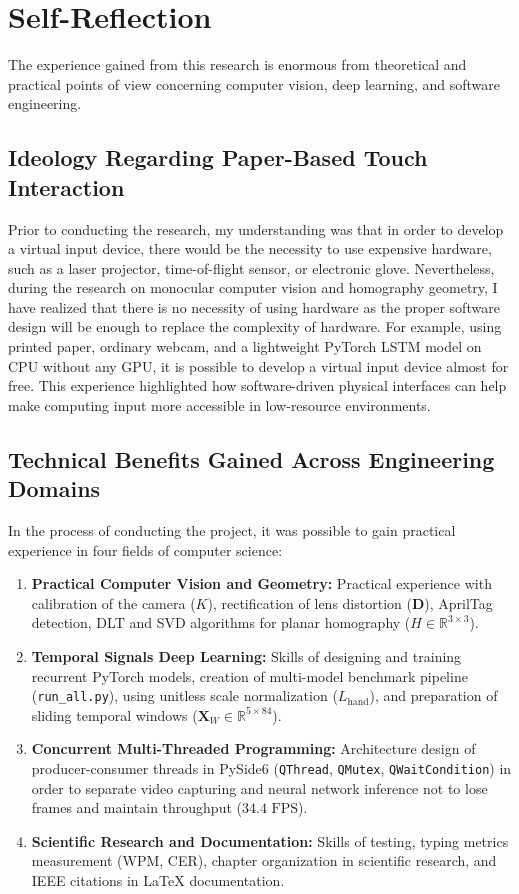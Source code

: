 \section{Self-Reflection}
\label{sec:concl_reflection}
The experience gained from this research is enormous from theoretical and practical points of view concerning computer vision, deep learning, and software engineering.

\subsection{Ideology Regarding Paper-Based Touch Interaction}
Prior to conducting the research, my understanding was that in order to develop a virtual input device, there would be the necessity to use expensive hardware, such as a laser projector, time-of-flight sensor, or electronic glove. Nevertheless, during the research on monocular computer vision and homography geometry, I have realized that there is no necessity of using hardware as the proper software design will be enough to replace the complexity of hardware. For example, using printed paper, ordinary webcam, and a lightweight PyTorch LSTM model on CPU without any GPU, it is possible to develop a virtual input device almost for free. This experience highlighted how software-driven physical interfaces can help make computing input more accessible in low-resource environments.

\subsection{Technical Benefits Gained Across Engineering Domains}
In the process of conducting the project, it was possible to gain practical experience in four fields of computer science:
\begin{enumerate}
    \item \textbf{Practical Computer Vision and Geometry:} Practical experience with calibration of the camera ($K$), rectification of lens distortion ($\mathbf{D}$), AprilTag detection, DLT and SVD algorithms for planar homography ($H \in \mathbb{R}^{3 \times 3}$).
    \item \textbf{Temporal Signals Deep Learning:} Skills of designing and training recurrent PyTorch models, creation of multi-model benchmark pipeline (\texttt{run\_all.py}), using unitless scale normalization ($L_{\text{hand}}$), and preparation of sliding temporal windows ($\mathbf{X}_W \in \mathbb{R}^{5 \times 84}$).
    \item \textbf{Concurrent Multi-Threaded Programming:} Architecture design of producer-consumer threads in PySide6 (\texttt{QThread}, \texttt{QMutex}, \texttt{QWaitCondition}) in order to separate video capturing and neural network inference not to lose frames and maintain throughput ($34.4\text{ FPS}$).
    \item \textbf{Scientific Research and Documentation:} Skills of testing, typing metrics measurement (WPM, CER), chapter organization in scientific research, and IEEE citations in LaTeX documentation.
\end{enumerate}

